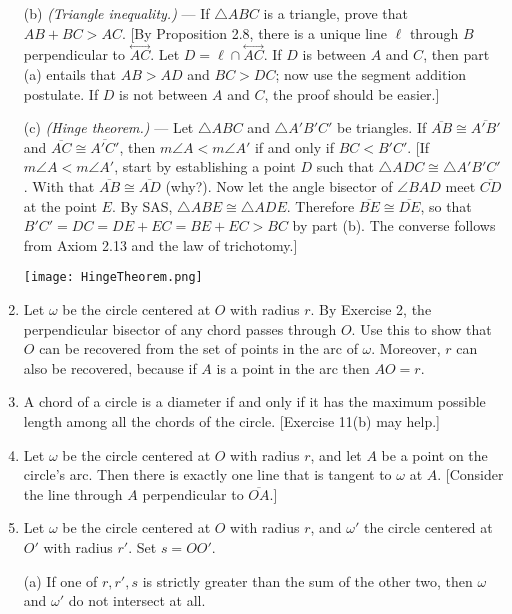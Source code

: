 \documentclass[leqno]{book}
\begin{document}
\begin{enumerate}
(b) \emph{(Triangle inequality.)} \----  If $\triangle ABC$ is a triangle, prove that $AB+BC>AC$.  [By Proposition 2.8, there is a unique line $\ell$ through $B$ perpendicular to $\overset{\longleftrightarrow}{AC}$.  Let $D=\ell\cap\overset{\longleftrightarrow}{AC}$.  If $D$ is between $A$ and $C$, then part (a) entails that $AB>AD$ and $BC>DC$; now use the segment addition postulate.  If $D$ is not between $A$ and $C$, the proof should be easier.]

(c) \emph{(Hinge theorem.)} \---- Let $\triangle ABC$ and $\triangle A'B'C'$ be triangles.  If $\overline{AB}\cong\overline{A'B'}$ and $\overline{AC}\cong\overline{A'C'}$, then $m\angle A<m\angle A'$ if and only if $BC<B'C'$.  [If $m\angle A<m\angle A'$, start by establishing a point $D$ such that $\triangle ADC\cong\triangle A'B'C'$.  With that $\overline{AB}\cong\overline{AD}$ (why?).  Now let the angle bisector of $\angle BAD$ meet $\overline{CD}$ at the point $E$.  By SAS, $\triangle ABE\cong\triangle ADE$.  Therefore $\overline{BE}\cong\overline{DE}$, so that $B'C'=DC=DE+EC=BE+EC>BC$ by part (b).  The converse follows from Axiom 2.13 and the law of trichotomy.]
\begin{center}\texttt{[image: HingeTheorem.png]}\end{center}

\item Let $\omega$ be the circle centered at $O$ with radius $r$.  By Exercise 2, the perpendicular bisector of any chord passes through $O$.  Use this to show that $O$ can be recovered from the set of points in the arc of $\omega$.  Moreover, $r$ can also be recovered, because if $A$ is a point in the arc then $AO=r$.

\item A chord of a circle is a diameter if and only if it has the maximum possible length among all the chords of the circle.  [Exercise 11(b) may help.]

\item Let $\omega$ be the circle centered at $O$ with radius $r$, and let $A$ be a point on the circle's arc.  Then there is exactly one line that is tangent to $\omega$ at $A$.  [Consider the line through $A$ perpendicular to $\overline{OA}$.]

\item Let $\omega$ be the circle centered at $O$ with radius $r$, and $\omega'$ the circle centered at $O'$ with radius $r'$.  Set $s=OO'$.

(a) If one of $r,r',s$ is strictly greater than the sum of the other two, then $\omega$ and $\omega'$ do not intersect at all.


\end{enumerate}
\end{document}
